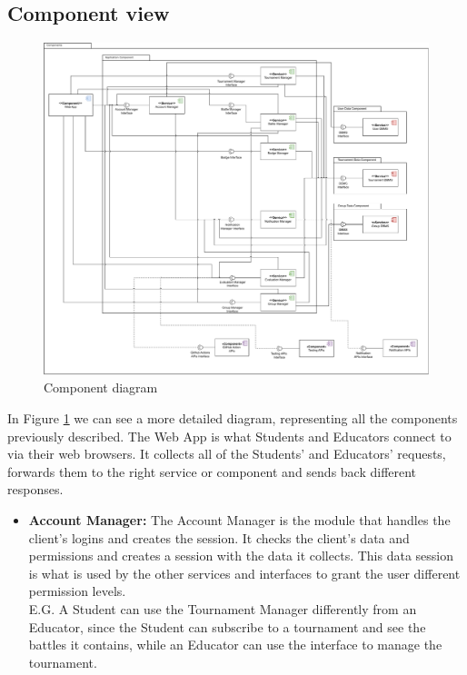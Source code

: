 \documentclass{article}
\begin{document}
{\subsection{Component view}
\begin{figure}[H]
    \centering
    \hspace*{-4cm}\includegraphics[scale=0.5]{images/ComponentView.pdf}
    \caption{Component diagram}
    \label{fig:componentView}
\end{figure}
In Figure \ref{fig:componentView} we can see a more detailed diagram, representing all the 
components previously described. The Web App is what Students and Educators connect to via their 
web browsers. It collects all of the Students' and Educators' requests, forwards them to the 
right service or component and sends back different responses.
\begin{itemize}
\item \textbf{Account Manager:} The Account Manager is the module that handles the client's 
logins and creates the session. It checks the client's data and permissions and creates a session 
with the data it collects. This data session is what is used by the other services and
interfaces to grant the user different permission levels. \\
E.G. A Student can use the Tournament Manager differently from an Educator, since the Student 
can subscribe to a tournament and see the battles it contains, while an Educator can use the 
interface to manage the tournament.\\

\end{itemize}}
\end{document}
